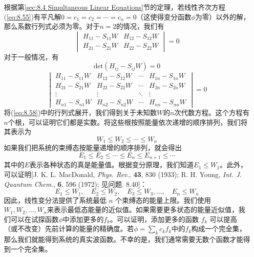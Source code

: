     根据第\ref{sec:8.4 Simultaneous Linear Equations}节的定理，若线性齐次方程(\ref{eq:8.55})有平凡解$0=c_1=c_2=\cdots=c_n=0$（这使得变分函数$\phi$为零）以外的解，那么系数行列式必须为零。对于$n=2$的情况，我们有
    \begin{equation}
        \begin{vmatrix}
            H_{11} - S_{11}W & H_{12} - S_{12}W \\
            H_{21} - S_{21}W & H_{22} - S_{22}W
        \end{vmatrix} = 0
        \label{eq:8.56}
    \end{equation}
    对于一般情况，有
    \begin{equation}
        \boxed{
            \mathrm{det}\left(H_{ij} - S_{ij}W\right) = 0
        }
        \label{eq:8.57}
    \end{equation}
    \begin{equation}
        \begin{vmatrix}
            H_{11} - S_{11}W & H_{12} - S_{12}W & \cdots & H_{1n} - S_{1n}W \\
            H_{21} - S_{21}W & H_{22} - S_{22}W & \cdots & H_{2n} - S_{2n}W \\
            \vdots & \vdots & \ddots & \vdots \\
            H_{n1} - S_{n1}W & H_{n2} - S_{n2}W & \cdots & H_{nn} - S_{nn}W
        \end{vmatrix} = 0
        \label{eq:8.58}
    \end{equation}
    将(\ref{eq:8.58})中的行列式展开，我们得到关于未知数$W$的$n$次代数方程。这个方程有$n$个根，可以证明它们都是实数。将这些根按照能量依次递增的顺序排列，我们将其表示为
    \begin{equation}
        W_1 \leq W_2 \leq \cdots \leq W_n
        \label{eq:8.59}
    \end{equation}
    如果我们把系统的束缚态按能量递增的顺序排列，就会得出
    \begin{equation}
        E_1 \leq E_2 \leq \cdots \leq E_n \leq E_{n+1} \leq \cdots
        \label{eq:8.60}
    \end{equation}
    其中的$E$表示各种状态的真是能量值。根据变分原理，我们知道$E_1 \leq W_1$。此外，可以证明[J. K. L. MacDonald, \textit{Phys. Rev.}, \textbf{43}, 830 (1933); R. H. Young, \textit{Int. J. Quantum Chem.}, \textbf{6}, 596 (1972); 见问题. 8.40]：
    \begin{equation}
        E_1 \leq W_1, \quad E_2 \leq W_2, \quad E_3 \leq W_3, \ldots, \quad E_n \leq W_n
        \label{eq:8.61}
    \end{equation}
    因此，线性变分法提供了系统最低 $n$ 个束缚态的能量上限。我们使用$W_1,W_2,\ldots,W_n$来表示最低态能量的近似值。如果需要更多状态的能量近似值，我们可以在试探函数$\phi$中添加更多的$f_k$。可以证明，添加更多的函数 $f_k$ 可以提高（或不改变）先前计算的能量的精确度。若$\phi = \sum_{k}c_kf_k$中的$f_k$构成一个完全集，那么我们就能得到系统的真实波函数。不幸的是，我们通常需要无数个函数才能得到一个完全集。

